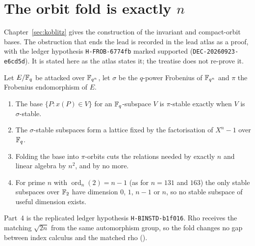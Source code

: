\section{The orbit fold is exactly $n$}\label{sec:kc-closure}

Chapter~\ref{sec:koblitz} gives the construction of the invariant and
compact-orbit bases. The obstruction that ends the lead is recorded in the
lead atlas as a proof, with the ledger hypothesis \texttt{H-FROB-6774fb}
marked supported (\texttt{DEC-20260923-e6cd5d}). It is stated here as the
atlas states it; the treatise does not re-prove it.

\begin{proposition}\label{prop:kc-closure}
Let $E/\mathbb{F}_q$ be attacked over $\mathbb{F}_{q^n}$, let $\sigma$ be the $q$-power
Frobenius of $\mathbb{F}_{q^n}$ and $\pi$ the Frobenius endomorphism of $E$.
\begin{enumerate}
\item The base $\{P: x(P)\in V\}$ for an $\mathbb{F}_q$-subspace $V$ is
  $\pi$-stable exactly when $V$ is $\sigma$-stable.
\item The $\sigma$-stable subspaces form a lattice fixed by the
  factorisation of $X^n-1$ over $\mathbb{F}_q$.
\item Folding the base into $\pi$-orbits cuts the relations needed by
  exactly $n$ and linear algebra by $n^2$, and by no more.
\item For prime $n$ with $\operatorname{ord}_n(2)=n-1$ (as for $n=131$ and
  $163$) the only stable subspaces over $\mathbb{F}_2$ have dimension $0$, $1$,
  $n-1$ or $n$, so no stable subspace of useful dimension exists.
\end{enumerate}
\end{proposition}

Part~4 is the replicated ledger hypothesis \texttt{H-BINSTD-b1f016}. Rho
receives the matching $\sqrt{2n}$ from the same automorphism group, so the
fold changes no gap between index calculus and the matched rho
().

